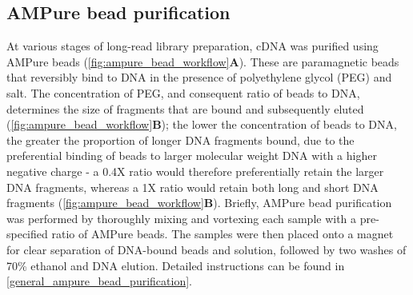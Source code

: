 \subsection{AMPure bead purification} 
\label{section:ch2_AMPure_explanation} 
At various stages of long-read library preparation, cDNA was purified using AMPure beads (\cref{fig:ampure_bead_workflow}\textbf{A}). These are paramagnetic beads that reversibly bind to DNA in the presence of polyethylene glycol (PEG) and salt. The concentration of PEG, and consequent ratio of beads to DNA, determines the size of fragments that are bound and subsequently eluted (\cref{fig:ampure_bead_workflow}\textbf{B}); the lower the concentration of beads to DNA, the greater the proportion of longer DNA fragments bound, due to the preferential binding of beads to larger molecular weight DNA with a higher negative charge - a 0.4X ratio would therefore preferentially retain the larger DNA fragments, whereas a 1X ratio would retain both long and short DNA fragments (\cref{fig:ampure_bead_workflow}\textbf{B}). Briefly, AMPure bead purification was performed by thoroughly mixing and vortexing each sample with a pre-specified ratio of AMPure beads. The samples were then placed onto a magnet for clear separation of DNA-bound beads and solution, followed by two washes of 70\% ethanol and DNA elution. Detailed instructions can be found in \cref{general_ampure_bead_purification}.

